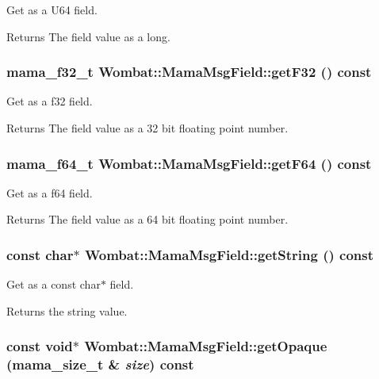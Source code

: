 Get as a U64 field. \begin{DoxyReturn}{Returns}
The field value as a long. 
\end{DoxyReturn}
\hypertarget{classWombat_1_1MamaMsgField_ac2644dee8474d59a6eefdf647640f0f0}{
\subsubsection[{getF32}]{\setlength{\rightskip}{0pt plus 5cm}mama\_\-f32\_\-t Wombat::MamaMsgField::getF32 () const}}
\label{classWombat_1_1MamaMsgField_ac2644dee8474d59a6eefdf647640f0f0}


Get as a f32 field. \begin{DoxyReturn}{Returns}
The field value as a 32 bit floating point number. 
\end{DoxyReturn}
\hypertarget{classWombat_1_1MamaMsgField_ad7d22896ab2dfd6e46de353fb98ee418}{
\subsubsection[{getF64}]{\setlength{\rightskip}{0pt plus 5cm}mama\_\-f64\_\-t Wombat::MamaMsgField::getF64 () const}}
\label{classWombat_1_1MamaMsgField_ad7d22896ab2dfd6e46de353fb98ee418}


Get as a f64 field. \begin{DoxyReturn}{Returns}
The field value as a 64 bit floating point number. 
\end{DoxyReturn}
\hypertarget{classWombat_1_1MamaMsgField_a9e7638cfd9b45e2cfd4c600c03beec95}{
\subsubsection[{getString}]{\setlength{\rightskip}{0pt plus 5cm}const char$\ast$ Wombat::MamaMsgField::getString () const}}
\label{classWombat_1_1MamaMsgField_a9e7638cfd9b45e2cfd4c600c03beec95}


Get as a const char$\ast$ field. \begin{DoxyReturn}{Returns}
the string value. 
\end{DoxyReturn}
\hypertarget{classWombat_1_1MamaMsgField_a59563f50a3498e338685b0c2ebc0526b}{
\subsubsection[{getOpaque}]{\setlength{\rightskip}{0pt plus 5cm}const void$\ast$ Wombat::MamaMsgField::getOpaque ({\bf mama\_\-size\_\-t} \& {\em size}) const}}
\label{classWombat_1_1MamaMsgField_a59563f50a3498e338685b0c2ebc0526b}


